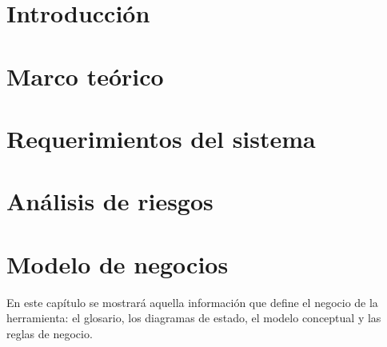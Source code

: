 \documentclass[10pt]{book}
\begin{document}

\thispagestyle{empty}


\frontmatter
\tableofcontents
\listoffigures
\mainmatter

 \hideControlVersion

\chapter{Introducción}\label{chp:introduccion}

\chapter{Marco teórico}\label{chp:marcoTeorico} 
\hypertarget{chp:marcoTeorico}{}
\chapter{Requerimientos del sistema}\label{chp:requerimientos}
\hypertarget{chp:requerimientos}{}
\chapter{Análisis de riesgos}\label{chp:riesgos}

\chapter{Modelo de negocios}\label{chp:modeloNegocios}
En este capítulo se mostrará aquella información que define el negocio de la herramienta: el glosario, los diagramas de estado, el modelo conceptual 
y las reglas de negocio.\\
\end{document}
